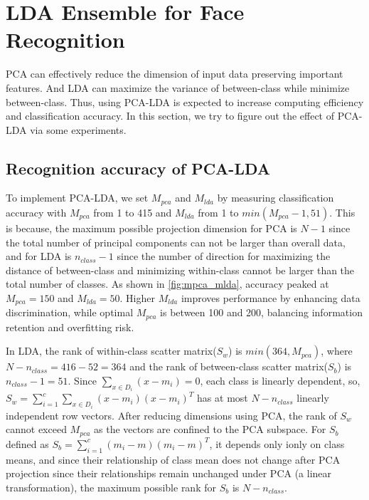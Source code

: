 \section{LDA Ensemble for Face Recognition}
\label{sec:intro}

PCA can effectively reduce the dimension of input data preserving important features. And LDA can maximize the variance of between-class while minimize between-class. Thus, using PCA-LDA is expected to increase computing efficiency and classification accuracy. In this section, we try to figure out the effect of PCA-LDA via some experiments.

\subsection{Recognition accuracy of PCA-LDA}

To implement PCA-LDA, we set $M_{pca}$ and $M_{lda}$ by measuring classification accuracy with $M_{pca}$ from 1 to 415 and $M_{lda}$ from 1 to $min(M_{pca}-1, 51)$. This is because, the maximum possible projection dimension for PCA is $N-1$ since the total number of principal components can not be larger than overall data, and for LDA is $n_{class}-1$ since the number of direction for maximizing the distance of between-class and minimizing within-class cannot be larger than the total number of classes. As shown in \cref{fig:mpca_mlda}, accuracy peaked at $M_{pca}=150$ and $M_{lda}=50$. Higher $M_{lda}$ improves performance by enhancing data discrimination, while optimal $M_{pca}$ is between 100 and 200, balancing information retention and overfitting risk.


In LDA, the rank of within-class scatter matrix($S_w$) is $min(364, M_{pca})$, where $N-n_{class}=416-52=364$ and the rank of between-class scatter matrix($S_b$) is $n_{class}-1=51$. Since $\sum_{x\in D_i} (x-m_i) = 0$, each class is linearly dependent, so, $S_w = \sum_{i=1}^c \sum_{x\in D_i} (x-m_i)(x-m_i)^T$ has at most $N-n_{class}$ linearly independent row vectors. After reducing dimensions using PCA, the rank of $S_w$ cannot exceed $M_{pca}$ as the vectors are confined to the PCA subspace. For $S_b$ defined as $S_b = \sum_{i=1}^c (m_i-m)(m_i-m)^T$, it depends only ionly on class means, and since their relationship of class mean does not change after PCA projection since their relationships remain unchanged under PCA (a linear transformation), the maximum possible rank for $S_b$ is $N - n_{class}$.


